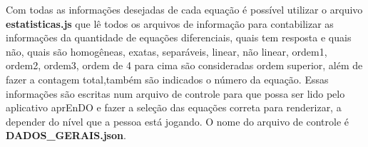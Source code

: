 Com todas as informações desejadas de cada equação é possível utilizar o arquivo \textbf{estatisticas.js} que lê todos os arquivos de informação para contabilizar as informações da quantidade de equações diferenciais, quais tem resposta e quais não, quais são homogêneas, exatas, separáveis, linear, não linear, ordem1, ordem2, ordem3, ordem de 4 para cima são consideradas ordem superior, além de fazer a contagem total,também são indicados o número da equação. Essas informações são escritas num arquivo de controle para que possa ser lido pelo aplicativo aprEnDO e fazer a seleção das equações correta para renderizar, a depender do nível que a pessoa está jogando. O nome do arquivo de controle é \textbf{DADOS\_GERAIS.json}.
